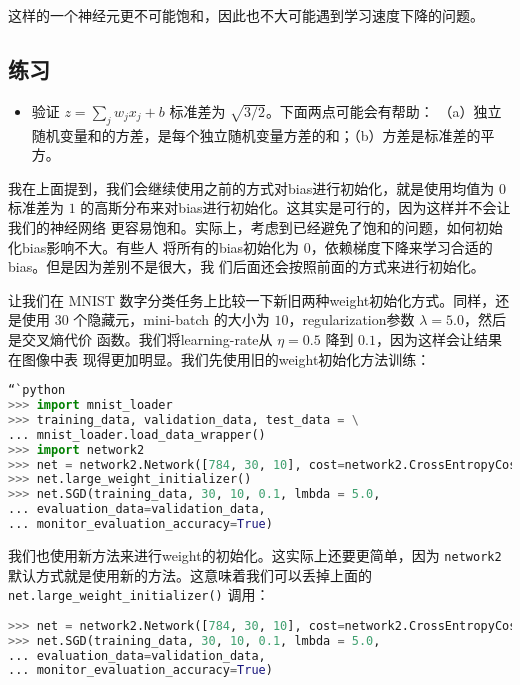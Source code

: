 这样的一个神经元更不可能饱和，因此也不大可能遇到学习速度下降的问题。

\subsection*{练习}

\begin{itemize}
\item 验证 $z = \sum_j w_j x_j + b$ 标准差为 $\sqrt{3/2}$。下面两点可能会有帮助：
  （a）独立随机变量和的方差，是每个独立随机变量方差的和；（b）方差是标准差的平方。
\end{itemize}

我在上面提到，我们会继续使用之前的方式对\gls*{bias}进行初始化，就是使用均值为 $0$ 标准差为
$1$ 的高斯分布来对\gls*{bias}进行初始化。这其实是可行的，因为这样并不会让我们的神经网络
更容易饱和。实际上，考虑到已经避免了饱和的问题，如何初始化\gls*{bias}影响不大。有些人
将所有的\gls*{bias}初始化为 $0$，依赖梯度下降来学习合适的\gls*{bias}。但是因为差别不是很大，我
们后面还会按照前面的方式来进行初始化。

让我们在 MNIST 数字分类任务上比较一下新旧两种\gls*{weight}初始化方式。同样，还是使用 $30$
个隐藏元，\gls*{mini-batch} 的大小为 $10$，\gls*{regularization}参数 $\lambda = 5.0$，然后是交叉熵代价
函数。我们将\gls*{learning-rate}从 $\eta=0.5$ 降到 $0.1$，因为这样会让结果在图像中表
现得更加明显。我们先使用旧的\gls*{weight}初始化方法训练：

\begin{lstlisting}[language=Python]
“`python
>>> import mnist_loader
>>> training_data, validation_data, test_data = \
... mnist_loader.load_data_wrapper()
>>> import network2
>>> net = network2.Network([784, 30, 10], cost=network2.CrossEntropyCost)
>>> net.large_weight_initializer()
>>> net.SGD(training_data, 30, 10, 0.1, lmbda = 5.0,
... evaluation_data=validation_data,
... monitor_evaluation_accuracy=True)
\end{lstlisting}

我们也使用新方法来进行\gls*{weight}的初始化。这实际上还要更简单，因为
\lstinline!network2! 默认方式就是使用新的方法。这意味着我们可以丢掉上面的
\lstinline!net.large_weight_initializer()! 调用：

\begin{lstlisting}[language=Python]
>>> net = network2.Network([784, 30, 10], cost=network2.CrossEntropyCost)
>>> net.SGD(training_data, 30, 10, 0.1, lmbda = 5.0,
... evaluation_data=validation_data,
... monitor_evaluation_accuracy=True)
\end{lstlisting}


